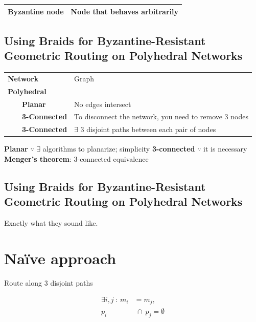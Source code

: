 \documentclass[11pt]{article}
\begin{document}
\begin{center}
\begin{tabular}{ll}
\hline
\textbf{Byzantine node} & Node that behaves arbitrarily\\[0pt]
\hline
\end{tabular}
\end{center}

\begin{center}

\end{center}
\subsection*{Using Braids for Byzantine-Resistant Geometric Routing on \textbf{Polyhedral Networks}}
\label{sec:orgdf5379e}

\begin{center}
\begin{tabular}{ll}
\hline
\textbf{Network} & Graph\\[0pt]
\textbf{Polyhedral} & \\[0pt]
    \textbf{Planar} & No edges intersect\\[0pt]
    \textbf{3-Connected} & To disconnect the network, you need to remove 3 nodes\\[0pt]
    \textbf{3-Connected} & \(\exists\) 3 disjoint paths between each pair of nodes\\[0pt]
\hline
\end{tabular}
\end{center}

\begin{NOTES}
\textbf{Planar} \(\because\) \(\exists\) algorithms to planarize; simplicity
\textbf{3-connected} \(\because\) it is necessary
\textbf{Menger's theorem}: 3-connected equivalence
\end{NOTES}
\subsection*{Using \textbf{Braids} for Byzantine-Resistant Geometric Routing on Polyhedral Networks}
\label{sec:orgb2dce79}

Exactly what they sound like.
\section*{Naïve approach}
\label{sec:org41d3fcc}

Route along 3 disjoint paths

\begin{align*}
\exists i,j \ : \ m_i &= m_j, \\
                  p_i &\ \cap \ p_j = \emptyset
\end{align*}
\end{document}
